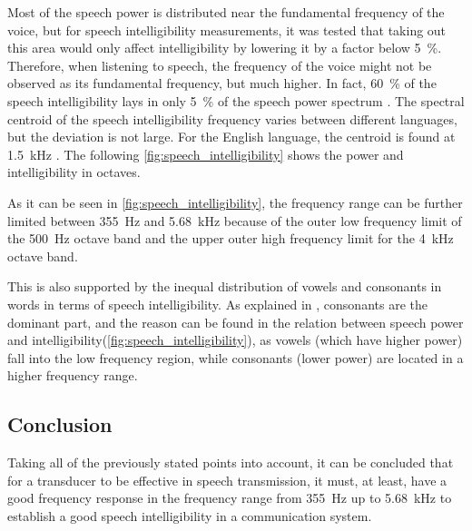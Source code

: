 Most of the speech power is distributed near the fundamental frequency of the voice, but for speech intelligibility measurements, it was tested that taking out this area would only affect intelligibility by lowering it by a factor below \SI{5}{\percent}. Therefore, when listening to speech, the frequency of the voice might not be observed as its fundamental frequency, but much higher. In fact, \SI{60}{\percent} of the speech intelligibility lays in only \SI{5}{\percent} of the speech power spectrum \citep{arl_us_army}. The spectral centroid of the speech intelligibility frequency varies between different languages, but the deviation is not large. For the English language, the centroid is found at \SI{1.5}{\kilo\hertz} \citep{arl_us_army}. The following \autoref{fig:speech_intelligibility} shows the power and intelligibility in octaves. 



As it can be seen in \autoref{fig:speech_intelligibility}, the frequency range can be further limited between \SI{355}{\hertz} and \SI{5.68}{\kilo\hertz} because of the outer low frequency limit of the \SI{500}{\hertz} octave band and the upper outer high frequency limit for the \SI{4}{\kilo\hertz} octave band. 

This is also supported by the inequal distribution of vowels and consonants in words in terms of speech intelligibility. As explained in \citep{arl_us_army}, consonants are the dominant part, and the reason can be found in the relation between speech power and intelligibility(\autoref{fig:speech_intelligibility}), as vowels (which have higher power) fall into the low frequency region, while consonants (lower power) are located in a higher frequency range.

\subsection{Conclusion}
Taking all of the previously stated points into account, it can be concluded that for a transducer to be effective in speech transmission, it must, at least, have a good frequency response in the frequency range from \SI{355}{\hertz} up to \SI{5.68}{\kilo\hertz} to establish a good speech intelligibility in a communication system.

